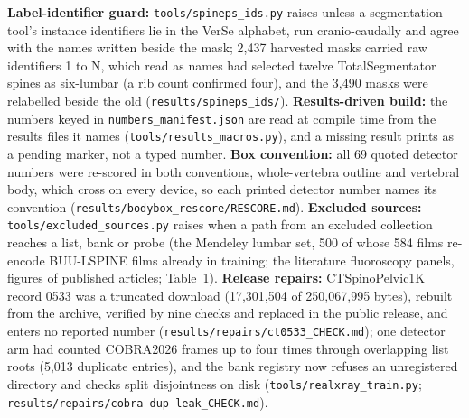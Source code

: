 \textbf{Label-identifier guard:} \texttt{tools/spineps\_ids.py} raises unless a segmentation tool's instance
identifiers lie in the VerSe alphabet, run cranio-caudally and agree with the names written beside the mask; 2,437
harvested masks carried raw identifiers 1 to N, which read as names had selected twelve TotalSegmentator spines as
six-lumbar (a rib count confirmed four), and the 3,490 masks were relabelled beside the old
(\texttt{results/spineps\_ids/}). \textbf{Results-driven build:} the numbers keyed in
\texttt{numbers\_manifest.json} are read at compile time from the results files it names
(\texttt{tools/results\_macros.py}), and a missing result prints as a pending marker, not a typed number.
\textbf{Box convention:} all 69 quoted detector numbers were re-scored in both conventions, whole-vertebra outline
and vertebral body, which cross on every device, so each printed detector number names its convention
(\texttt{results/bodybox\_rescore/RESCORE.md}). \textbf{Excluded sources:} \texttt{tools/excluded\_sources.py}
raises when a path from an excluded collection reaches a list, bank or probe (the Mendeley lumbar set, 500 of whose
584 films re-encode BUU-LSPINE films already in training; the literature fluoroscopy panels, figures of published
articles; Table~1). \textbf{Release repairs:} CTSpinoPelvic1K record 0533 was a truncated download (17,301,504 of
250,067,995 bytes), rebuilt from the archive, verified by nine checks and replaced in the public release, and enters
no reported number (\texttt{results/repairs/ct0533\_CHECK.md}); one detector arm had counted COBRA2026 frames up to
four times through overlapping list roots (5,013 duplicate entries), and the bank registry now refuses an
unregistered directory and checks split disjointness on disk (\texttt{tools/realxray\_train.py};
\texttt{results/repairs/cobra-dup-leak\_CHECK.md}).




